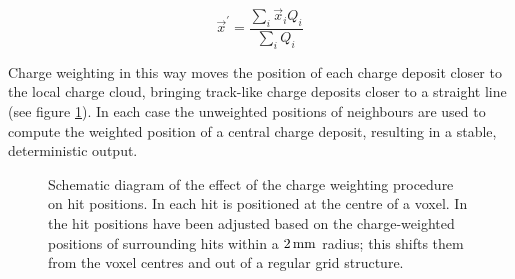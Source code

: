 \begin{equation}\label{eqn:charge_weighted_avg_position}
	\vec{x}^\prime = \frac{\displaystyle \sum_i \vec{x}_i Q_i}{\displaystyle \sum_i Q_i}
\end{equation}

Charge weighting in this way moves the position of each charge deposit closer to the local charge cloud, bringing track-like charge deposits closer to a straight line (see figure \ref{fig:ca_charge_weighting}). In each case the unweighted positions of neighbours are used to compute the weighted position of a central charge deposit, resulting in a stable, deterministic output.

\begin{figure}
\centering
{}
\caption[Diagram of the effect of charge weighting on hit position]{\label{fig:ca_charge_weighting}Schematic diagram of the effect of the charge weighting procedure on hit positions. In  each hit is positioned at the centre of a voxel. In  the hit positions have been adjusted based on the charge-weighted positions of surrounding hits within a $2\,\mathrm{mm}$ radius; this shifts them from the voxel centres and out of a regular grid structure.}
\end{figure}

